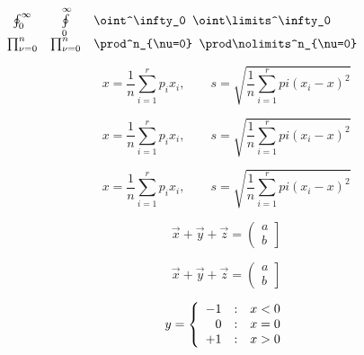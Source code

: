 \documentclass{article}
\begin{document}
    \begin{math}
        \begin{array}{ccl}
            \oint^\infty_0 & \oint\limits^\infty_0 & \verb=\oint^\infty_0 \oint\limits^\infty_0= \\
            \prod^n_{\nu=0} & \prod\nolimits^n_{\nu=0} & \verb|\prod^n_{\nu=0} \prod\nolimits^n_{\nu=0}| \\
        \end{array}
    \end{math}


    \begin{equation}
        x=\frac{1}{n}\sum_{i=1}^rp_ix_i,\qquad s=\sqrt{\frac{1}{n}\sum_{i=1}^rpi(x_i-x)^2}
    \end{equation}

    \begin{displaymath}
        x=\frac{1}{n}\sum_{i=1}^rp_ix_i,\qquad s=\sqrt{\frac{1}{n}\sum_{i=1}^rpi(x_i-x)^2}
    \end{displaymath}

    \[ x=\frac{1}{n}\sum_{i=1}^rp_ix_i,\qquad s=\sqrt{\frac{1}{n}\sum_{i=1}^rpi(x_i-x)^2}\]

    \begin{displaymath}
        \vec{x} + \vec{y} + \vec{z}=\left(\begin{array}{c}a \\ b \end{array} \right]
    \end{displaymath}

    \[ \vec{x} + \vec{y} + \vec{z}=\left(\begin{array}{c}a \\ b \end{array} \right] \]


    \begin{displaymath}
        y=\left\{
            \begin{array}{r@{\quad:\quad}l}
                -1 & x<0 \\
                0  & x=0 \\
                +1 & x>0
            \end{array}
        \right.
    \end{displaymath}
\end{document}
